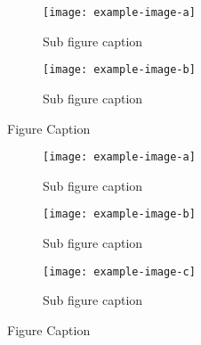 \begin{figure}
    \centering
    \begin{subfigure}[b]{0.49\textwidth}
        \centering
        \texttt{[image: example-image-a]}
        \caption{Sub figure caption}
    \end{subfigure}
    \hfill
    \begin{subfigure}[b]{0.49\textwidth}
        \centering
        \texttt{[image: example-image-b]}
        \caption{Sub figure caption}
    \end{subfigure}
    \caption{Figure Caption}
\end{figure}


\begin{figure}
     \centering
     \begin{subfigure}[b]{0.32\textwidth}
         \centering
         \texttt{[image: example-image-a]}
         \caption{Sub figure caption}
     \end{subfigure}
     \hfill
     \begin{subfigure}[b]{0.32\textwidth}
         \centering
         \texttt{[image: example-image-b]}
         \caption{Sub figure caption}
     \end{subfigure}
     \hfill
     \begin{subfigure}[b]{0.32\textwidth}
         \centering
         \texttt{[image: example-image-c]}
         \caption{Sub figure caption}
     \end{subfigure}
     \caption{Figure Caption}
\end{figure}


